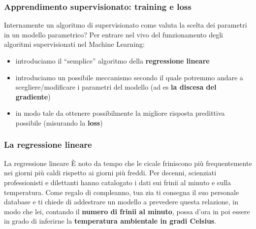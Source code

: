 \begin{frame}

	\frametitle{Apprendimento supervisionato: training e loss}

	\begin{block}{Internamente un algoritmo di \ml supervisionato come valuta la scelta dei parametri in un modello parametrico?}
		Per entrare nel vivo del funzionamento degli algoritmi supervisionati nel Machine Learning:
		\begin{itemize}
			\item introduciamo il ``semplice'' algoritmo della \textbf{regressione lineare}
			\item introduciamo un possibile meccanismo secondo il quale potremmo andare a scegliere/modificare i parametri del modello (ad es \textbf{la discesa del gradiente})
			\item in modo tale da ottenere possibilmente la migliore risposta predittiva possibile (misurando la \textbf{loss})
		\end{itemize}
	\end{block}

\end{frame}


\begin{frame}

	\frametitle{La regressione lineare}

	\begin{block}{La regressione lineare}
		È noto da tempo che le cicale friniscono più frequentemente nei giorni più caldi rispetto ai giorni più freddi.
		\newlinedouble
		\pause
		Per decenni, scienziati professionisti e dilettanti hanno catalogato i dati sui frinii al minuto e sulla temperatura.
		\newlinedouble
		\pause
		Come regalo di compleanno, tua zia ti consegna il suo personale database e ti chiede di addestrare un modello a prevedere questa relazione, in modo che lei, contando il \textbf{numero di frinii al minuto}, possa d'ora in poi essere in grado di inferirne la \textbf{temperatura ambientale in gradi Celsius}.
	\end{block}

\end{frame}



